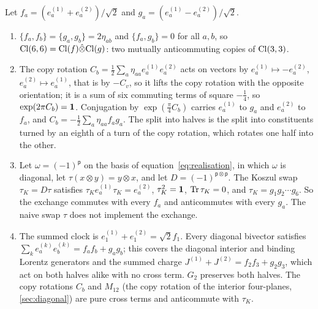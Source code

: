 \begin{proposition}
\label{d5:prop:cmrel}
Let $f_a=(e^{(1)}_a+e^{(2)}_a)/\sqrt2$ and $g_a=(e^{(1)}_a-e^{(2)}_a)/\sqrt2$.
\begin{enumerate}[label=(\roman*),leftmargin=2.2em]
\item $\{f_a,f_b\}=\{g_a,g_b\}=2\eta_{ab}$ and $\{f_a,g_b\}=0$ for all $a,b$, so $\mathrm{Cl}(6,6)=\mathrm{Cl}(f)\hat\otimes\mathrm{Cl}(g)$: two mutually anticommuting
copies of $\mathrm{Cl}(3,3)$.
\item The copy rotation $C_b=\tfrac12\sum_a\eta_{aa}e^{(1)}_ae^{(2)}_a$ acts on vectors by $e^{(1)}_a\mapsto-e^{(2)}_a$, $e^{(2)}_a\mapsto e^{(1)}_a$, that is by $-C_v$, so it lifts the copy rotation with the opposite orientation; it is a sum of
six commuting terms of square $-\tfrac14$, so $\exp(2\pi C_b)=\mathbf 1$. Conjugation by $\exp(\tfrac\pi4C_b)$ carries $e^{(1)}_a$ to $g_a$ and $e^{(2)}_a$ to
$f_a$, and $C_b=-\tfrac12\sum_a\eta_{aa}f_ag_a$. The split into halves is the split into constituents turned by an eighth of a turn of the
copy rotation, which rotates one half into the other.
\item Let $\omega=(-1)^{\mathsf p}$ on the basis of equation~\cref{eq:realisation}, in which $\omega$ is diagonal, let $\tau(x\otimes y)=y\otimes x$, and let
$D=(-1)^{\mathsf p\otimes\mathsf p}$. The Koszul swap $\tau_K=D\tau$ satisfies $\tau_Ke^{(1)}_a\tau_K=e^{(2)}_a$, $\tau_K^2=\mathbf 1$, $\operatorname{Tr}\tau_K=0$, and
$\tau_K=g_1g_2\cdots g_6$. So the exchange commutes with every $f_a$ and anticommutes with every $g_a$. The naive swap $\tau$ does not implement
the exchange.
\item The summed clock is $e^{(1)}_1+e^{(2)}_1=\sqrt2f_1$. Every diagonal bivector satisfies $\sum_ke^{(k)}_ae^{(k)}_b=f_af_b+g_ag_b$; this covers the
diagonal interior and binding Lorentz generators and the summed charge $J^{(1)}+J^{(2)}=f_2f_3+g_2g_3$, which act on both halves alike
with no cross term. $G_2$ preserves both halves. The copy rotations $C_b$ and $M_{12}$ (the copy rotation of the interior four-planes, \cref{sec:diagonal}) are pure
cross terms and anticommute with $\tau_K$.
\end{enumerate}
\end{proposition}

